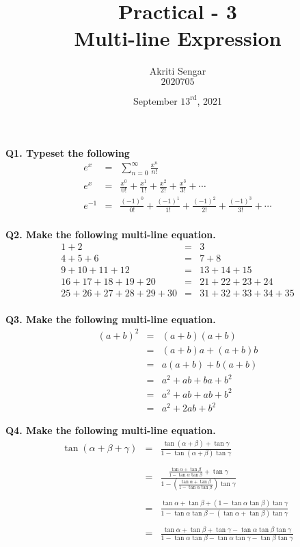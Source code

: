 \documentclass{article}
\title{\textbf{Practical - 3} \\ Multi-line Expression}
\author{Akriti Sengar \\ $2020705$}
\date{September $13^{\text{rd}}$, 2021}
\begin{document}
	\maketitle
	\noindent \textbf{Q1. Typeset the following}
	\begin{eqnarray*}
		e^x & = & \sum\limits_{n=0}^{\infty}\frac{x^n}{n!}\\
		e^x & = & \frac{x^0}{0!}+ \frac{x^1}{1!}+ \frac{x^2}{2!}+ \frac{x^3}{3!}+ \cdots\\
		e^{-1} & = & \frac{({-1})^0}{0!}+ \frac{({-1})^1}{1!}+ \frac{({-1})^2}{2!}+ \frac{({-1})^3}{3!}+ \cdots\\
	\end{eqnarray*}
	
	\noindent \textbf{Q2. Make the following multi-line equation.}
	\begin{eqnarray*}
		1+2 & = & 3\\
		4+5+6 & = & 7+8\\
		9+10+11+12 & = & 13+14+15\\
		16+17+18+19+20 & = & 21+22+23+24\\
		25+26+27+28+29+30 & = & 31+32+33+34+35\\
	\end{eqnarray*}
	
	\noindent \textbf{Q3. Make the following multi-line equation.}
	\begin{eqnarray*}
		(a+b)^2 & = & (a+b)(a+b)\\
		& = & (a+b)a+(a+b)b\\
		& = & a(a+b)+b(a+b)\\
		& = & a^2+ab+ba+b^2\\
		& = & a^2+ab+ab+b^2\\
		& = & a^2+2ab+b^2 
	\end{eqnarray*}
	
	\noindent \textbf{Q4. Make the following multi-line equation.}
	\begin{eqnarray*}
		\tan(\alpha+\beta+\gamma) & = & \frac{\tan(\alpha+\beta)+\tan\gamma}{1-\tan(\alpha+\beta)\tan\gamma}\\\\
		& = & \frac{\frac{\tan\alpha+\tan\beta}{1-\tan\alpha\tan\beta}+\tan\gamma}{1-\left( \frac{\tan\alpha+\tan\beta}{1-\tan\alpha\tan\beta} \right)\tan\gamma}\\\\
		& = & \frac{\tan\alpha+\tan\beta+(1-\tan\alpha\tan\beta)\tan\gamma}{1-\tan\alpha\tan\beta-(\tan\alpha+\tan\beta)\tan\gamma}\\\\
		& = & \frac{\tan\alpha+\tan\beta+\tan\gamma-\tan\alpha\tan\beta\tan\gamma}{1-\tan\alpha\tan\beta-\tan\alpha\tan\gamma-\tan\beta\tan\gamma}
	\end{eqnarray*}
	
\end{document}

